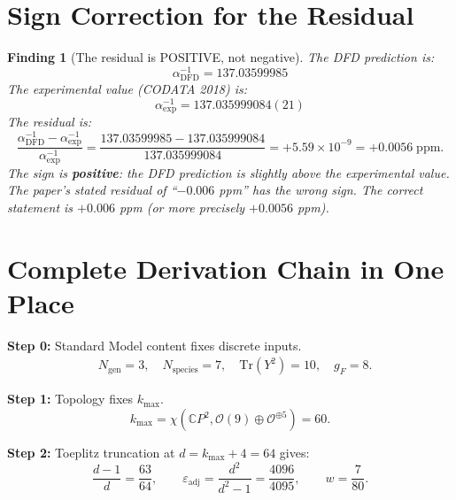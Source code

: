 \documentclass[11pt,a4paper]{article}
\newtheorem{finding}{Finding}
\theoremstyle{definition}
\begin{document}
\section{Sign Correction for the Residual}

\begin{finding}[The residual is POSITIVE, not negative]
\label{find:sign}
The DFD prediction is:
\begin{equation}
\alpha^{-1}_{\mathrm{DFD}} = 137.03599985
\end{equation}
The experimental value (CODATA 2018) is:
\begin{equation}
\alpha^{-1}_{\mathrm{exp}} = 137.035999084(21)
\end{equation}
The residual is:
\begin{equation}
\frac{\alpha^{-1}_{\mathrm{DFD}} - \alpha^{-1}_{\mathrm{exp}}}
     {\alpha^{-1}_{\mathrm{exp}}}
= \frac{137.03599985 - 137.035999084}{137.035999084}
= +5.59 \times 10^{-9}
= \mathbf{+0.0056\;\mathrm{ppm}}.
\end{equation}
The sign is \textbf{positive}: the DFD prediction is slightly \emph{above}
the experimental value.  The paper's stated residual of ``$-0.006$ ppm''
has the wrong sign.  The correct statement is $+0.006$ ppm (or more precisely
$+0.0056$ ppm).
\end{finding}

\section{Complete Derivation Chain in One Place}

\noindent\textbf{Step 0:} Standard Model content fixes discrete inputs.
\begin{align}
&N_{\mathrm{gen}} = 3, \quad N_{\mathrm{species}} = 7, \quad
\mathrm{Tr}(Y^2) = 10, \quad g_F = 8.
\end{align}

\noindent\textbf{Step 1:} Topology fixes $k_{\max}$.
\begin{equation}
k_{\max} = \chi(\mathbb{C}P^2, \mathcal{O}(9) \oplus \mathcal{O}^{\oplus 5}) = 60.
\end{equation}

\noindent\textbf{Step 2:} Toeplitz truncation at $d = k_{\max}+4 = 64$ gives:
\begin{equation}
\frac{d{-}1}{d} = \frac{63}{64}, \qquad
\varepsilon_{\mathrm{adj}} = \frac{d^2}{d^2-1} = \frac{4096}{4095}, \qquad
w = \frac{7}{80}.
\end{equation}
\end{document}
